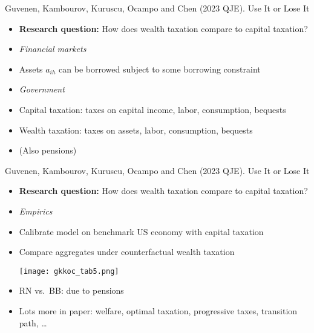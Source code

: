 \documentclass[aspectratio=169,compress,t,xcolor=table]{beamer}
\begin{document}
\begin{frame}{}
Guvenen, Kambourov, Kuruscu, Ocampo and Chen (2023 QJE). Use It or Lose It 
  \begin{itemize}
    \item {\color{MyStructure}\textbf{Research question:}} How does wealth taxation compare to capital taxation?
    \vfill\item \textit{Financial markets}
    \item Assets \(a_{ih}\) can be borrowed subject to some borrowing constraint
    \vfill\item \textit{Government}
    \item Capital taxation: taxes on capital income, labor, consumption, bequests
    \item Wealth taxation: taxes on assets, labor, consumption, bequests
    \item (Also pensions)
  \end{itemize}
\end{frame}

\begin{frame}{}
Guvenen, Kambourov, Kuruscu, Ocampo and Chen (2023 QJE). Use It or Lose It 
  \begin{itemize}
    \item {\color{MyStructure}\textbf{Research question:}} How does wealth taxation compare to capital taxation?
    \vfill\item \textit{Empirics}
    \item Calibrate model on benchmark US economy with capital taxation
    \item Compare aggregates under counterfactual wealth taxation
    \begin{center}
      \texttt{[image: gkkoc\_tab5.png]}
    \end{center}
    \item RN vs.\ BB: due to pensions
    \item Lots more in paper: welfare, optimal taxation, progressive taxes, transition path, \ldots
  \end{itemize}
\end{frame}
\end{document}
